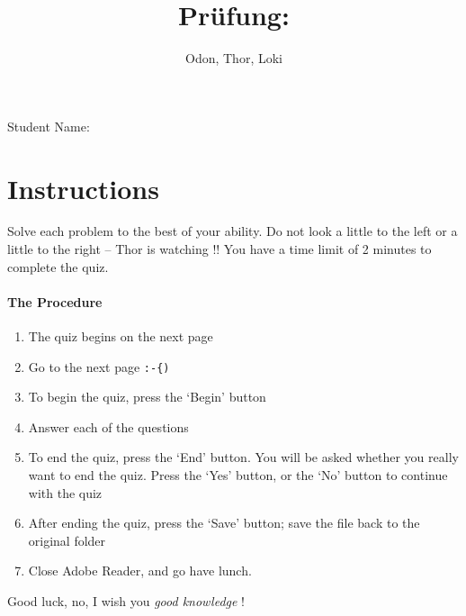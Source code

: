 \documentclass{article}
\title{Pr\"{u}fung: \thqzname}
\author{Odon, Thor, Loki}
\begin{document}
\ifforweb
  \makeinlinetitle
\else
  \maketitle
\fi

\thispagestyle{empty}

\noindent
Student Name: \FullName{1.5in}{11bp}

\section*{Instructions}

Solve each problem to the best of your ability. Do not look a
little to the left or a little to the right -- Thor is watching
!! You have a time limit of 2 minutes to complete the quiz.

\paragraph*{The Procedure}
\begin{enumerate}
  \item The quiz begins on the next page
  \item Go to the next page \verb!:-{)!
  \item To begin the quiz, press the `\textsf{Begin}' button
  \item Answer each of the questions
  \item To end the quiz, press the `\textsf{End}' button. You
      will be asked whether you really want to end the quiz. Press the
      `\textsf{Yes}' button, or the `\textsf{No}' button to continue with the quiz
  \item After ending the quiz, press the `\textsf{Save}' button; save the file
    back to the original folder
  \item Close \textsf{Adobe Reader}, and go have lunch.
\end{enumerate}
Good luck, no, I wish you \emph{good knowledge} !

\newpage

\end{document}

